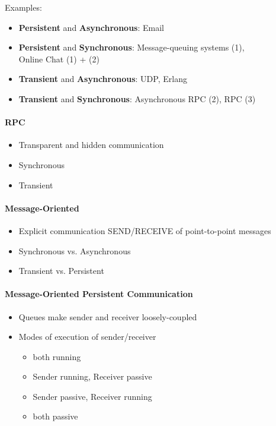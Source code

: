 Examples:
\begin{itemize}
\item \textbf{Persistent} and \textbf{Asynchronous}: Email

\item \textbf{Persistent} and \textbf{Synchronous}:
  Message-queuing systems (1), \\
  Online Chat (1) + (2)

\item \textbf{Transient} and \textbf{Asynchronous}: UDP, Erlang

\item \textbf{Transient} and \textbf{Synchronous}:
  Asynchronous RPC (2), RPC (3)
\end{itemize}

\paragraph{RPC}
\begin{itemize}
\item Transparent and hidden communication
\item Synchronous
\item Transient
\end{itemize}

\paragraph{Message-Oriented}
\begin{itemize}
\item Explicit communication SEND/RECEIVE of point-to-point
  messages
\item Synchronous vs. Asynchronous
\item Transient vs. Persistent
\end{itemize}

\paragraph{Message-Oriented Persistent Communication}
\begin{itemize}
\item Queues make sender and receiver loosely-coupled
\item Modes of execution of sender/receiver
  \begin{itemize}
  \item both running
  \item Sender running, Receiver passive
  \item Sender passive, Receiver running
  \item both passive
  \end{itemize}
\end{itemize}


